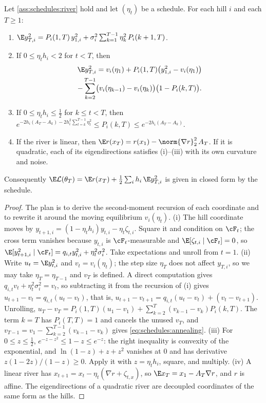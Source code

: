 \begin{refsection}
\begin{theorem}\label{thm:schedules:river}
Let \cref{ass:schedules:river} hold and let $(\eta_t)$ be a schedule. For each hill $i$ and each $T\ge1$:
\begin{enumerate}
\item $\E y_{T,i}^2=P_i(1,T)\,y_{1,i}^2+\sigma_i^2\sum_{k=1}^{T-1}\eta_k^2\,P_i(k+1,T)$.
\item If $0\le\eta_th_i<2$ for $t<T$, then
\begin{multline}\label{eq:schedules:annealing}
  \E y_{T,i}^2=v_i(\eta_1)+P_i(1,T)\bigl(y_{1,i}^2-v_i(\eta_1)\bigr)\\
  -\sum_{k=2}^{T-1}\bigl(v_i(\eta_{k-1})-v_i(\eta_k)\bigr)\bigl(1-P_i(k,T)\bigr).
\end{multline}
\item If $0\le\eta_th_i\le\frac12$ for $k\le t<T$, then $e^{-2h_i(A_T-A_k)-2h_i^2\sum_{t=k}^{T-1}\eta_t^2}\le P_i(k,T)\le e^{-2h_i(A_T-A_k)}$.
\item If the river is linear, then $\E r(x_T)=r(x_1)-\norm{\nabla r}_2^2\,A_T$. If it is quadratic, each of its eigendirections satisfies (i)--(iii) with its own curvature and noise.
\end{enumerate}
Consequently $\E\Loss(\theta_T)=\E r(x_T)+\frac12\sum_ih_i\,\E y_{T,i}^2$ is given in closed form by the schedule.
\end{theorem}

\begin{proof}
The plan is to derive the second-moment recursion of each coordinate and to rewrite it around the moving equilibrium $v_i(\eta_t)$. (i) The hill coordinate moves by $y_{t+1,i}=(1-\eta_th_i)y_{t,i}-\eta_t\zeta_{t,i}$. Square it and condition on $\cF_t$; the cross term vanishes because $y_{t,i}$ is $\cF_t$-measurable and $\E[\zeta_{t,i}\mid\cF_t]=0$, so $\E[y_{t+1,i}^2\mid\cF_t]=q_{i,t}y_{t,i}^2+\eta_t^2\sigma_i^2$. Take expectations and unroll from $t=1$.
(ii) Write $u_t=\E y_{t,i}^2$ and $v_t=v_i(\eta_t)$; the step size $\eta_T$ does not affect $y_{T,i}$, so we may take $\eta_T=\eta_{T-1}$ and $v_T$ is defined. A direct computation gives $q_{i,t}v_t+\eta_t^2\sigma_i^2=v_t$, so subtracting it from the recursion of (i) gives $u_{t+1}-v_t=q_{i,t}(u_t-v_t)$, that is, $u_{t+1}-v_{t+1}=q_{i,t}(u_t-v_t)+(v_t-v_{t+1})$. Unrolling, $u_T-v_T=P_i(1,T)(u_1-v_1)+\sum_{k=2}^{T}(v_{k-1}-v_k)P_i(k,T)$. The term $k=T$ has $P_i(T,T)=1$ and cancels the unused $v_T$, and $v_{T-1}=v_1-\sum_{k=2}^{T-1}(v_{k-1}-v_k)$ gives \eqref{eq:schedules:annealing}.
(iii) For $0\le z\le\frac12$, $e^{-z-z^2}\le1-z\le e^{-z}$: the right inequality is convexity of the exponential, and $\ln(1-z)+z+z^2$ vanishes at $0$ and has derivative $z(1-2z)/(1-z)\ge0$. Apply it with $z=\eta_th_i$, square, and multiply.
(iv) A linear river has $x_{t+1}=x_t-\eta_t(\nabla r+\zeta_{t,x})$, so $\E x_T=x_1-A_T\nabla r$, and $r$ is affine. The eigendirections of a quadratic river are decoupled coordinates of the same form as the hills.
\end{proof}


\end{refsection}
